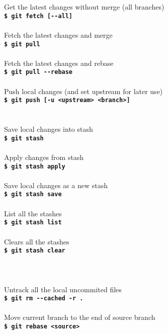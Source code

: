 \documentclass[12pt,a3paper,margin=4pt,landscape]{article}
\newcommand{\cmd}[2]{
	#1\\
	\texttt{\textbf{\$ git #2}}\\
	\\
}
\newcommand{\cmdnoline}[2]{
	#1\\
	\texttt{\textbf{\$ git #2}}
}
\newcommand{\sect}[2]{
	\section*{\color{#1}{#2}}
}
\begin{document}
\begin{multicols}{4}


\sect{Orange}{Synchronize}

\cmd{Get the latest changes without merge (all branches)}{fetch [-{}-all]}
\cmd{Fetch the latest changes and merge}{pull}
\cmd{Fetch the latest changes and rebase}{pull -{}-rebase}
\cmdnoline{Push local changes (and set upstream for later use)}{push [-u <upstream> <branch>]}

\begin{adjustwidth}{0.5\columnwidth}{0pt}
\sect{BrickRed}{Stash}
\cmd{Save local changes into stash}{stash}
\cmd{Apply changes from stash}{stash apply}
\cmd{Save local changes as a new stash}{stash save}
\cmd{List all the stashes}{stash list}
\cmd{Clears all the stashes}{stash clear}

\sect{Blue}{Repair}
\cmd{Untrack all the local uncommited files}{rm -{}-cached -r .}
\cmd{Move current branch to the end of source branch}{rebase <source>}
\end{adjustwidth}


\end{multicols}
\end{document}
